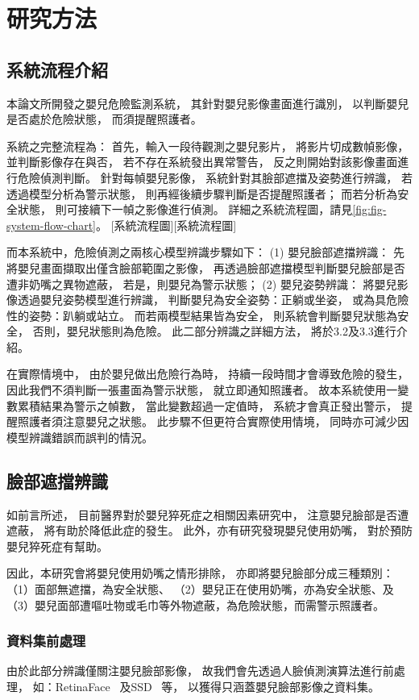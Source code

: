 \documentclass[class=NCU_thesis, crop=false]{standalone}
\begin{document}
\chapter{研究方法}

\section{系統流程介紹}
本論文所開發之嬰兒危險監測系統，
其針對嬰兒影像畫面進行識別，
以判斷嬰兒是否處於危險狀態，
而須提醒照護者。

系統之完整流程為：
首先，輸入一段待觀測之嬰兒影片，
將影片切成數幀影像，
並判斷影像存在與否，
若不存在系統發出異常警告，
反之則開始對該影像畫面進行危險偵測判斷。
針對每幀嬰兒影像，
系統針對其臉部遮擋及姿勢進行辨識，
若透過模型分析為警示狀態，
則再經後續步驟判斷是否提醒照護者；
而若分析為安全狀態，
則可接續下一幀之影像進行偵測。
詳細之系統流程圖，請見\cref{fig:fig-system-flow-chart}。
[系統流程圖][系統流程圖]

而本系統中，危險偵測之兩核心模型辨識步驟如下：
(1) 嬰兒臉部遮擋辨識：
先將嬰兒畫面擷取出僅含臉部範圍之影像，
再透過臉部遮擋模型判斷嬰兒臉部是否遭非奶嘴之異物遮蔽，
若是，則嬰兒為警示狀態；
(2) 嬰兒姿勢辨識：
將嬰兒影像透過嬰兒姿勢模型進行辨識，
判斷嬰兒為安全姿勢：正躺或坐姿，
或為具危險性的姿勢：趴躺或站立。
而若兩模型結果皆為安全，
則系統會判斷嬰兒狀態為安全，
否則，嬰兒狀態則為危險。
此二部分辨識之詳細方法，
將於3.2及3.3進行介紹。

在實際情境中，
由於嬰兒做出危險行為時，
持續一段時間才會導致危險的發生，
因此我們不須判斷一張畫面為警示狀態，
就立即通知照護者。
故本系統使用一變數累積結果為警示之幀數，
當此變數超過一定值時，
系統才會真正發出警示，
提醒照護者須注意嬰兒之狀態。
此步驟不但更符合實際使用情境，
同時亦可減少因模型辨識錯誤而誤判的情況。

\section{臉部遮擋辨識}
如前言所述，
目前醫界對於嬰兒猝死症之相關因素研究中，
注意嬰兒臉部是否遭遮蔽，
將有助於降低此症的發生。
此外，亦有研究發現嬰兒使用奶嘴，
對於預防嬰兒猝死症有幫助。

因此，本研究會將嬰兒使用奶嘴之情形排除，
亦即將嬰兒臉部分成三種類別：
（1）面部無遮擋，為安全狀態、
（2）嬰兒正在使用奶嘴，亦為安全狀態、及
（3）嬰兒面部遭嘔吐物或毛巾等外物遮蔽，為危險狀態，而需警示照護者。

\subsection{資料集前處理}
由於此部分辨識僅關注嬰兒臉部影像，
故我們會先透過人臉偵測演算法進行前處理，
如：RetinaFace~\cite{deng_retinaface_2020}
及SSD~\cite{ye_face_2021}
等，
以獲得只涵蓋嬰兒臉部影像之資料集。
\end{document}
